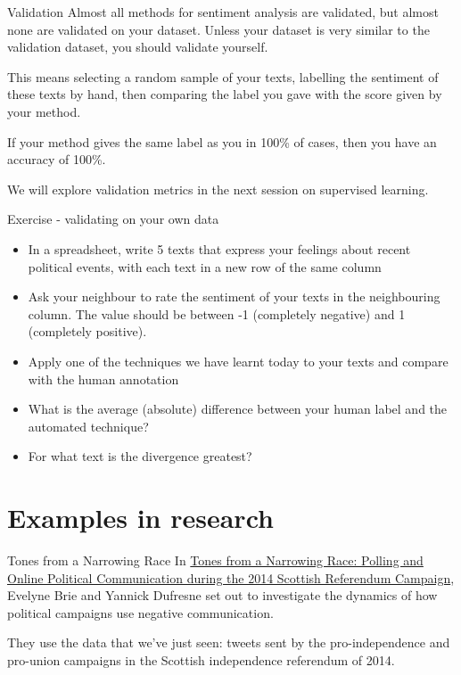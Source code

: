 \documentclass[
  10pt,
  ignorenonframetext,
  aspectratio=169]{beamer}
\providecommand{\tightlist}{%
  \setlength{\itemsep}{0pt}\setlength{\parskip}{0pt}}
\begin{document}
\begin{frame}{Validation}
\protect\hypertarget{validation-1}{}
Almost all methods for sentiment analysis are validated, but almost none
are validated on your dataset. Unless your dataset is very similar to
the validation dataset, you should validate yourself.

This means selecting a random sample of your texts, labelling the
sentiment of these texts by hand, then comparing the label you gave with
the score given by your method.

If your method gives the same label as you in 100\% of cases, then you
have an accuracy of 100\%.

We will explore validation metrics in the next session on supervised
learning.
\end{frame}

\begin{frame}{Exercise - validating on your own data}
\protect\hypertarget{exercise---validating-on-your-own-data}{}
\begin{itemize}
\tightlist
\item
  In a spreadsheet, write 5 texts that express your feelings about
  recent political events, with each text in a new row of the same
  column
\item
  Ask your neighbour to rate the sentiment of your texts in the
  neighbouring column. The value should be between -1 (completely
  negative) and 1 (completely positive).
\item
  Apply one of the techniques we have learnt today to your texts and
  compare with the human annotation
\item
  What is the average (absolute) difference between your human label and
  the automated technique?
\item
  For what text is the divergence greatest?
\end{itemize}
\end{frame}

\hypertarget{examples-in-research}{%
\section{Examples in research}\label{examples-in-research}}

\begin{frame}{Tones from a Narrowing Race}
\protect\hypertarget{tones-from-a-narrowing-race}{}
In
\href{https://www.cambridge.org/core/journals/british-journal-of-political-science/article/tones-from-a-narrowing-race-polling-and-online-political-communication-during-the-2014-scottish-referendum-campaign/49CEE09374F4729B4C0B7048FBA4521C}{Tones
from a Narrowing Race: Polling and Online Political Communication during
the 2014 Scottish Referendum Campaign}, Evelyne Brie and Yannick
Dufresne set out to investigate the dynamics of how political campaigns
use negative communication.

They use the data that we've just seen: tweets sent by the
pro-independence and pro-union campaigns in the Scottish independence
referendum of 2014.
\end{frame}
\end{document}
